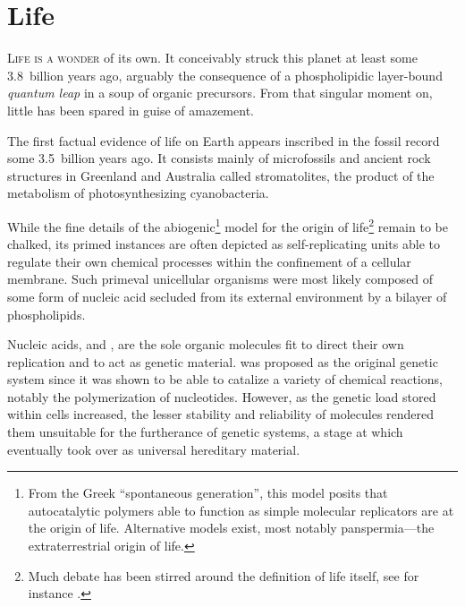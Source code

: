 \documentclass{tufte-book}
\begin{document}
\section{Life}

\textsc{Life is a wonder} of its own.  It conceivably struck this planet at
least some 3.8~billion years ago,\cite{mojzsis_evidence_1996} arguably the
consequence of a phospholipidic \mbox{layer-bound} \emph{quantum leap} in a soup
of organic precursors.\cite{miller_organic_1959} From that singular moment on,
little has been spared in guise of amazement.\bigskip

The first factual evidence of life on Earth appears inscribed in the fossil
record some 3.5~billion years ago.  It consists mainly of microfossils and
ancient rock structures in Greenland and Australia called
stromatolites,\cite{ohtomo_evidence_2014,noffke_microbially_2013} the product of
the metabolism of photosynthesizing cyanobacteria.

While the fine details of the abiogenic\footnote{From the Greek ``spontaneous
  generation'', this model posits that autocatalytic polymers able to function
  as simple molecular replicators are at the origin of life.  Alternative models
  exist, most notably panspermia---the extraterrestrial origin of life.} model
for the origin of life\footnote{Much debate has been stirred around the
  definition of life itself, see for instance \citealp{benner_defining_2010}.}
remain to be chalked, its primed instances are often depicted as
\mbox{self-replicating} units able to regulate their own chemical processes
within the confinement of a cellular membrane.  Such primeval unicellular
organisms were most likely composed of some form of nucleic acid secluded from
its external environment by a bilayer of phospholipids.

Nucleic acids,  and , are the sole organic
molecules fit to direct their own replication and to act as genetic material.
 was proposed as the original genetic system since it was shown
to be able to catalize a variety of chemical reactions, notably the
polymerization of nucleotides.\cite{bass_specific_1984} However, as the genetic
load stored within cells increased, the lesser stability and reliability of
 molecules rendered them unsuitable for the furtherance of
genetic systems, a stage at which  eventually took over as
universal hereditary material.
\end{document}
